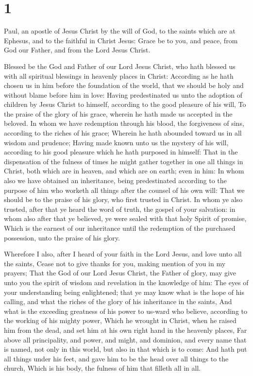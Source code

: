 \hypertarget{section}{%
\section{1}\label{section}}

 Paul, an apostle of Jesus Christ by the will of God, to the
saints which are at Ephesus, and to the faithful in Christ Jesus:
 Grace be to you, and peace, from God our Father, and from
the Lord Jesus Christ.

 Blessed be the God and Father of our Lord Jesus Christ, who
hath blessed us with all spiritual blessings in heavenly places in
Christ:  According as he hath chosen us in him before the
foundation of the world, that we should be holy and without blame before
him in love:  Having predestinated us unto the adoption of
children by Jesus Christ to himself, according to the good pleasure of
his will,  To the praise of the glory of his grace, wherein
he hath made us accepted in the beloved.  In whom we have
redemption through his blood, the forgiveness of sins, according to the
riches of his grace;  Wherein he hath abounded toward us in
all wisdom and prudence;  Having made known unto us the
mystery of his will, according to his good pleasure which he hath
purposed in himself:  That in the dispensation of the
fulness of times he might gather together in one all things in Christ,
both which are in heaven, and which are on earth; even in him:
 In whom also we have obtained an inheritance, being
predestinated according to the purpose of him who worketh all things
after the counsel of his own will:  That we should be to
the praise of his glory, who first trusted in Christ.  In
whom ye also trusted, after that ye heard the word of truth, the gospel
of your salvation: in whom also after that ye believed, ye were sealed
with that holy Spirit of promise,  Which is the earnest of
our inheritance until the redemption of the purchased possession, unto
the praise of his glory.

 Wherefore I also, after I heard of your faith in the Lord
Jesus, and love unto all the saints,  Cease not to give
thanks for you, making mention of you in my prayers;  That
the God of our Lord Jesus Christ, the Father of glory, may give unto you
the spirit of wisdom and revelation in the knowledge of him:
 The eyes of your understanding being enlightened; that ye
may know what is the hope of his calling, and what the riches of the
glory of his inheritance in the saints,  And what is the
exceeding greatness of his power to us-ward who believe, according to
the working of his mighty power,  Which he wrought in
Christ, when he raised him from the dead, and set him at his own right
hand in the heavenly places,  Far above all principality,
and power, and might, and dominion, and every name that is named, not
only in this world, but also in that which is to come:  And
hath put all things under his feet, and gave him to be the head over all
things to the church,  Which is his body, the fulness of
him that filleth all in all.

